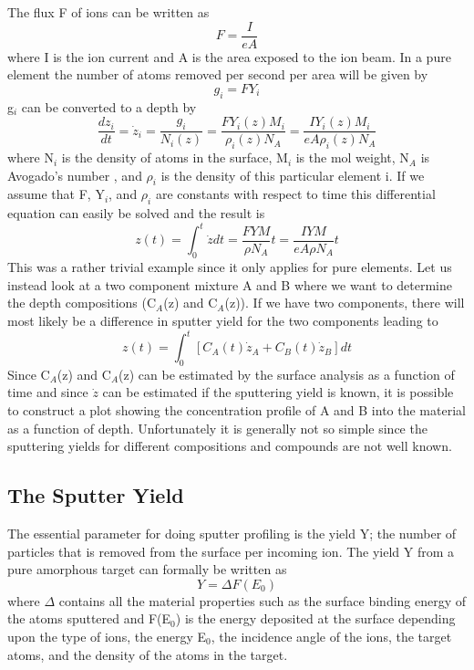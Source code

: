  The flux F of ions can be written as
 \begin{equation}
 F=\frac{I}{eA}
 \end{equation}
 where I is the ion current and A is the area exposed to the
 ion beam. In a pure element the number of atoms removed per
 second per area will be given by \begin{equation} g_{i} =
 FY_{i} \end{equation} g$_{i}$ can be converted to a depth by
 \begin{equation}
 \frac{dz_{i}}{dt}=\dot{z}_{i}=\frac{g_{i}}{N_{i}(z)}=\frac{FY_{i}(z)M_{i}}{\rho_{i}(z)
 N_{A}}=\frac{IY_{i}(z)M_{i}}{e A \rho_{i}(z) N_{A}}
 \end{equation} where N$_{i}$ is the density of atoms in the
 surface, M$_{i}$ is the mol weight, N$_{A}$ is Avogado's
 number , and $\rho_{i}$ is the density of this particular
 element i. If we assume that F, Y$_{i}$, and $\rho_{i}$ are
 constants with respect to time this differential equation
 can easily be solved and the result is \begin{equation}
 z(t)=\int_{0}^{t}\dot{z}dt = \frac{FYM}{\rho N_{A}} t =
 \frac{IYM}{e A \rho N_{A}} t \end{equation}
 This was a rather trivial example since it only
 applies for pure elements. Let us instead look at a two component mixture A
 and B where we want to determine the depth compositions
 (C$_{A}$(z) and C$_{A}$(z)). If we have two components,
 there will most likely be a difference in sputter yield for
 the two components leading to \begin{equation}
 z(t)=\int_{0}^{t}
 [C_{A}(t)\dot{z}_{A}+C_{B}(t)\dot{z}_{B}]dt \end{equation}
 Since C$_{A}$(z) and C$_{A}$(z) can be estimated by the
 surface analysis as a function of time and since $\dot{z}$
 can be estimated if the sputtering yield is known, it is
 possible to construct a plot showing the concentration
 profile of A and B into the material as a function of depth.
 Unfortunately it is generally not so simple since the
 sputtering yields for different compositions and compounds are
 not well known.


\subsection{The Sputter Yield}

 The essential parameter for doing sputter profiling is
 the yield Y; the number of particles that is removed from the
 surface per incoming ion. The yield Y from a pure amorphous
 target can formally be written as \begin{equation} Y=\Delta
 F(E_{0}) \end{equation} where $\Delta$ contains all the
 material properties such as the surface binding energy of
 the atoms sputtered and F(E$_{0}$) is the energy deposited
 at the surface depending upon the type of ions, the energy
 E$_{0}$, the incidence angle of the ions, the target
 atoms, and the density of the atoms in the target.

